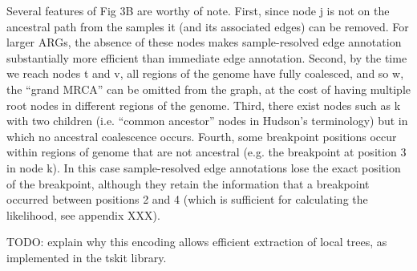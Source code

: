 \documentclass{article}
\begin{document}

Several features of Fig 3B are worthy of note. First, since node \textsf{j} is not on
the ancestral path from the samples it (and its associated edges) can be removed.
For larger ARGs, the absence of these nodes makes sample-resolved edge annotation
substantially more efficient than immediate edge annotation.
Second, by the time we reach
nodes \textsf{t} and \textsf{v}, all regions of the genome have fully coalesced, and so
\textsf{w}, the ``grand MRCA'' can be omitted from the graph, at the cost of having
multiple root nodes in different regions of the genome.
Third, there exist nodes such as
\textsf{k} with two children (i.e. ``common ancestor'' nodes in Hudson's terminology)
but in which no ancestral coalescence occurs. Fourth, some breakpoint positions occur
within regions of genome that are not ancestral (e.g. the breakpoint at position 3 in
node \textsf{k}). In this case sample-resolved edge annotations lose the exact position of
the breakpoint, although they retain the information that a breakpoint occurred between
positions 2 and 4 (which is sufficient for calculating the likelihood, see appendix XXX).

TODO: explain why this encoding allows efficient extraction of local trees, as implemented in the tskit library.

\end{document}
